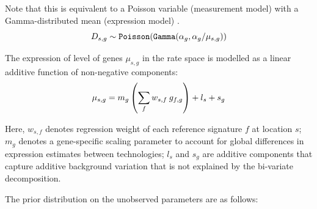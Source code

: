 \documentclass[11pt,a4paper]{article}
\begin{document}
Note that this is equivalent to a Poisson variable (measurement model) with a Gamma-distributed mean (expression model)
\cite{sarkar_separating_2020}.
\begin{equation} \label{eq:c2l:1}
D_{s,g} \sim \mathtt{Poisson}(\mathtt{Gamma}(\alpha_g, \alpha_g / \mu_{s,g})) \\
\end{equation}

The expression of level of genes $\mu_{s,g}$ in the rate space is modelled as a linear additive function of non-negative components:
\begin{equation} \label{eq:c2l:3}
\mu_{s,g} = m_{g} \left (\sum_{f} {w_{s,f} \: g_{f,g}} \right) + l_s + s_{g}\\
\end{equation}

Here, $w_{s,f}$ denotes regression weight of each reference signature $f$ at location $s$; 
$m_{g}$ denotes a gene-specific scaling parameter to account for global differences in expression estimates between technologies;
$l_{s}$ and $s_{g}$ are additive components that capture additive background variation that is not explained by the bi-variate decomposition.

The prior distribution on the unobserved parameters are as follows:
\end{document}
